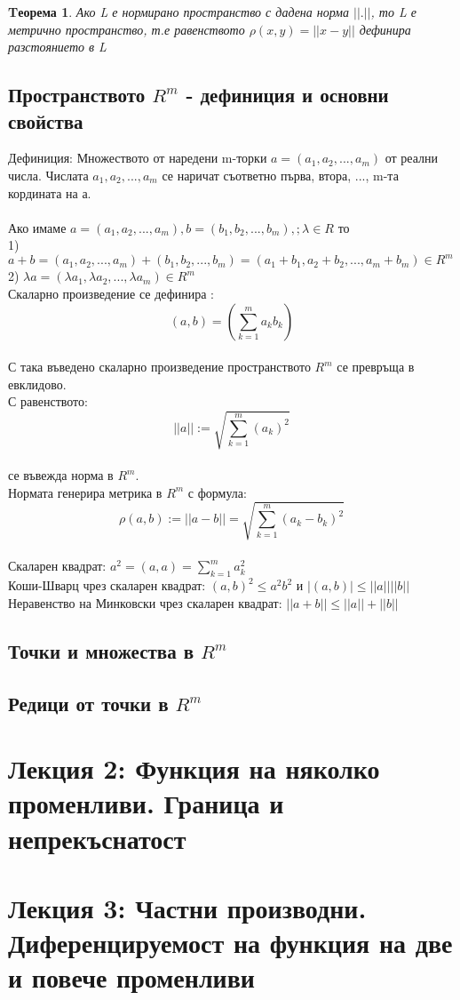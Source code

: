 \documentclass[fleqn]{article}
\newtheorem{theorem}{Tеорема}[section]
\begin{document}
\begin{theorem}
Ако L е нормирано пространство с дадена норма $|| . ||$, то L е метрично пространство, т.е равенството $\rho(x,y) = ||x - y||$ дефинира  разстоянието в L
\end{theorem}

\subsection{Пространството $R^m$ - дефиниция и основни свойства}

Дефиниция: Множеството от наредени m-торки $a = (a_1, a_2, ... , a_m)$ от реални числа. Числата $a_1, a_2, ... , a_m$ се наричат съответно първа, втора, ..., m-та кордината на а.\\
\\
 Ако имаме $a = (a_1, a_2, ... , a_m), b = (b_1, b_2, ... , b_m), ; \lambda \in R $ то\\
	1) $a+b =(a_1, a_2, ... , a_m) +  (b_1, b_2, ... , b_m) = (a_1 + b_1, a_2+b_2, ... , a_m + b_m) \in R^m$
	2) $ \lambda a =(\lambda a_1,\lambda a_2, ... , \lambda a_m) \in R^m $\\
Скаларно произведение се дефинира : $$ (a,b) = \left( \sum_{k=1}^{m}a_kb_k \right )$$\\
С така въведено скаларно произведение пространството $R^m$ се превръща в евклидово.\\
С равенството:
$$||a|| := \sqrt{ \sum_{k=1}^{m}(a_k)^2  }$$ \\
се въвежда норма в $R^m$.
\\
 Нормата генерира метрика в $R^m$ с формула: 
$$\rho(a,b) := ||a-b|| = \sqrt{ \sum_{k=1}^{m} (a_k - b_k)^2} $$\\
Скаларен квадрат: $a^2 = (a,a) = \sum _{k=1}^{m}a_k^2$\\
Коши-Шварц чрез скаларен квадрат: $(a,b)^2 \leq a^2b^2$ и $|(a,b)|\leq ||a|| ||b||$\\ 
Неравенство на Минковски чрез скаларен квадрат: $||a+b||\leq ||a|| + ||b||$
\subsection{Точки и множества в $R^m$}

\subsection{Редици от точки в $R^m$}

\section{Лекция 2: Функция на няколко променливи. Граница и непрекъснатост}

\section{Лекция 3: Частни производни. Диференцируемост на функция на две и повече променливи }
\end{document}

